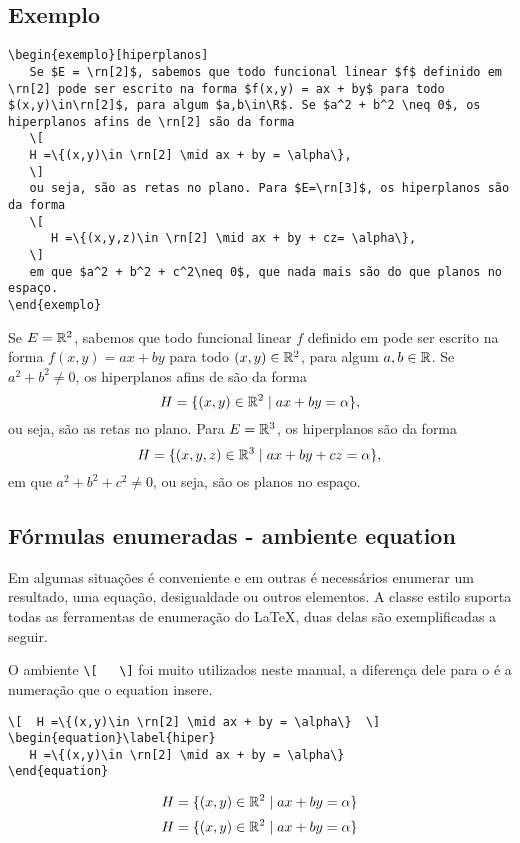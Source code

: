 \subsection{Exemplo}
\begin{tcolorbox}
\begin{lstlisting}
\begin{exemplo}[hiperplanos]
   Se $E = \rn[2]$, sabemos que todo funcional linear $f$ definido em \rn[2] pode ser escrito na forma $f(x,y) = ax + by$ para todo $(x,y)\in\rn[2]$, para algum $a,b\in\R$. Se $a^2 + b^2 \neq 0$, os hiperplanos afins de \rn[2] são da forma
   \[
   H =\{(x,y)\in \rn[2] \mid ax + by = \alpha\},
   \]
   ou seja, são as retas no plano. Para $E=\rn[3]$, os hiperplanos são da forma
   \[
      H =\{(x,y,z)\in \rn[2] \mid ax + by + cz= \alpha\},
   \]
   em que $a^2 + b^2 + c^2\neq 0$, que nada mais são do que planos no espaço.
\end{exemplo}
\end{lstlisting}
\tcblower
\begin{exemplo}[hiperplanos]
	Se $E = \rn[2]$, sabemos que todo funcional linear $f$ definido em \rn[2] pode ser escrito na forma $f(x,y) = ax + by$ para todo $(x,y)\in\rn[2]$, para algum $a,b\in\R$. Se $a^2 + b^2 \neq 0$, os hiperplanos afins de \rn[2] são da forma
	\[
	H =\{(x,y)\in \rn[2] \mid ax + by = \alpha\},
	\]
	ou seja, são as retas no plano. Para $E=\rn[3]$, os hiperplanos são da forma
	\[
	H =\{(x,y,z)\in \rn[3] \mid ax + by + cz= \alpha\},
	\]
	em que $a^2 + b^2 + c^2\neq 0$, ou seja, são os planos no espaço.
\end{exemplo}
\end{tcolorbox}

\subsection{Fórmulas enumeradas - ambiente equation}
 Em algumas situações é conveniente e em outras é necessários enumerar um resultado, uma equação, desigualdade ou outros elementos. A classe estilo suporta todas as ferramentas de enumeração
 do \LaTeX, duas delas são exemplificadas a seguir.
\begin{tcolorbox}[title={Ambiente equation}]
 O ambiente \verb|\[   \]| foi muito utilizados neste manual, a diferença dele para o 
  é a numeração que o equation insere. 
\begin{lstlisting}
\[  H =\{(x,y)\in \rn[2] \mid ax + by = \alpha\}  \]
\begin{equation}\label{hiper}
   H =\{(x,y)\in \rn[2] \mid ax + by = \alpha\}
\end{equation}
\end{lstlisting}

\tcblower

\[  
   H =\{(x,y)\in \rn[2] \mid ax + by = \alpha\}  
\]
\begin{equation}\label{hiper}
   H =\{(x,y)\in \rn[2] \mid ax + by = \alpha\}
\end{equation}
\end{tcolorbox}

